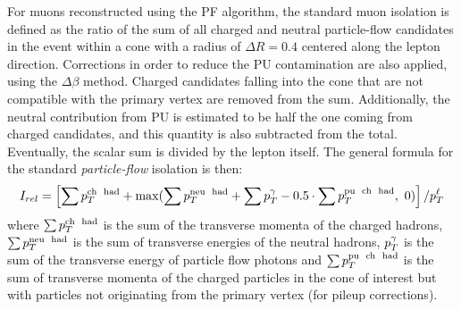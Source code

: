 


For muons reconstructed using the PF algorithm, the standard muon isolation is defined as the ratio of the \pt sum of all charged and neutral particle-flow candidates in the event within a cone with a radius of $\Delta R=0.4$ centered along the lepton direction. Corrections in order to reduce the PU contamination are also applied, using the $\Delta \beta$ method.
Charged candidates falling into the cone that are not compatible with the primary vertex are removed from the sum. Additionally, the neutral contribution from PU is estimated to be half the one coming from charged candidates, and this quantity is also subtracted from the total. Eventually, the scalar sum is divided by the lepton \pt itself. The general formula for the standard \emph{particle-flow} isolation is then:
$$I_{rel} = \left[ \sum p_T^\text{ch \ had} + \max(\sum p_T^\text{neu \ had} + \sum p_T^{\gamma} - 0.5 \cdot \sum p_T^\text{pu \ ch \ had}, \ 0) \right] /p_T^\ell $$
where $\sum p_T^\text{ch \ had}$ is the sum of the transverse momenta of the charged hadrons, $\sum p_T^\text{neu \ had}$ is the sum of transverse energies of the neutral hadrons, $p_T^{\gamma}$ is the sum of the transverse energy of particle flow photons and $\sum p_T^\text{pu \ ch \ had}$ is the sum of transverse momenta of the charged particles in the cone of interest but with particles not originating from the primary vertex (for pileup corrections). %

